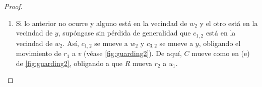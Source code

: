 \begin{proof}
\begin{enumerate}
\begin{enumerate}
\begin{figure}[ht!]
\begin{tcbitemize}
{\begin{tikzpicture}
                                \end{tikzpicture}
                            }
                    \tcbitem
                        \tcblower
                    \tcbitem[raster multicolumn=2]
                        \tcblower
                \end{tcbitemize}
                \captionsetup{font=footnotesize}
                \caption{En (a), $R$ acaba de mover $r_2$ a $u_1$, por lo que $C$
                mueve como en (b) para forzar el movimiento de $r_1$ a $b$,
                quedando en una situaci\'on an\'aloga a la mostrada en (a) de
                \cref{fig:guarding}.}
                \label{fig:guarding62}
            \end{figure}

            \item Si lo anterior no ocurre y alguno est\'a en la vecindad de
            $w_2$ y el otro est\'a en la vecindad de $y$, sup\'ongase sin
            p\'erdida de generalidad que $c_{1,2}$ est\'a en la vecindad de
            $w_2$. As\'i, $c_{1,2}$ se mueve a $w_2$ y $c_{3,2}$ se mueve a $y$,
            obligando el movimiento de $r_1$ a $v$ (v\'ease
            \cref{fig:guarding2}). De aqu\'i, $C$ mueve como en (e) de
            \cref{fig:guarding2}, obligando a que $R$ mueva $r_2$ a $u_1$.


\end{enumerate}
\end{enumerate}
\end{proof}
